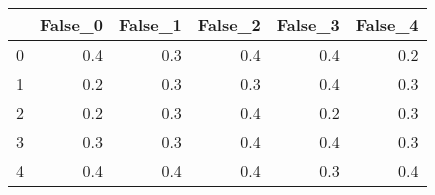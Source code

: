\begin{tabular}{lrrrrr}
\toprule
{} &  False\_0 &  False\_1 &  False\_2 &  False\_3 &  False\_4 \\ \hline
\midrule
0 &      0.4 &      0.3 &      0.4 &      0.4 &      0.2 \\ \hline
1 &      0.2 &      0.3 &      0.3 &      0.4 &      0.3 \\ \hline
2 &      0.2 &      0.3 &      0.4 &      0.2 &      0.3 \\ \hline
3 &      0.3 &      0.3 &      0.4 &      0.4 &      0.3 \\ \hline
4 &      0.4 &      0.4 &      0.4 &      0.3 &      0.4 \\ \hline
\bottomrule
\end{tabular}
